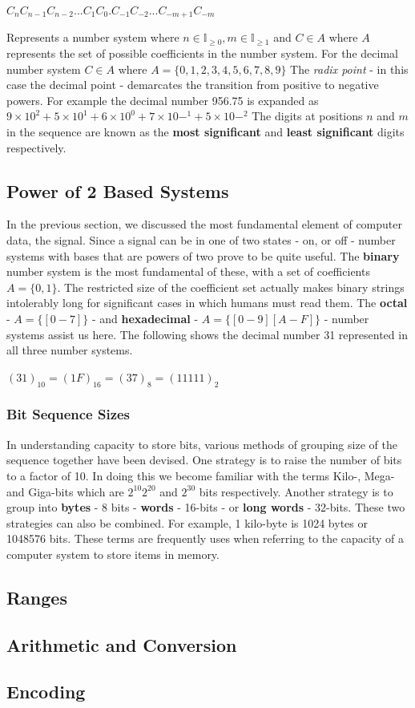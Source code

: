 \documentclass[10pt,a4paper]{article}
\begin{document}
\begin{center}
$C_{n} C_{n-1} C_{n-2}...C_{1} C_{0}.C_{-1} C_{-2}...C_{-m+1} C_{-m}$
\end{center}
Represents a number system where $n \in \mathbb{I}_{\geq0}, m \in \mathbb{I}_{\geq1}$ and $C \in A$ where $A$ represents the set of possible coefficients in the number system. For the decimal number system $C \in A$ where $A = \{0,1,2,3,4,5,6,7,8,9\}$
\newline\newline
The {\it radix point} - in this case the decimal point - demarcates the transition from positive to negative powers. For example the decimal number 956.75 is expanded as 
$9\times10^2 + 5\times10^1 + 6\times10^0 + 7\times10-^1 + 5\times10-^2$
\newline\newline
The digits at positions $n$ and $m$ in the sequence are known as the {\bf most significant} and {\bf least significant} digits respectively. 
\subsection{Power of 2 Based Systems}
In the previous section, we discussed the most fundamental element of computer data, the signal. Since a signal can be in one of two states - on, or off - number systems with bases that are powers of two prove to be quite useful. The {\bf binary} number system is the most fundamental of these, with a set of coefficients $A = \{0,1\}$. The restricted size of the coefficient set actually makes binary strings intolerably long for significant cases in which humans must read them. The {\bf octal} - $A= \{[0 - 7]\}$ - and {\bf hexadecimal} - $A = \{[0-9][A-F]\}$ - number systems assist us here. The following shows the decimal number 31 represented in all three number systems. 
\begin{center}
$(31)_{10} = (1F)_{16} = (37)_8 = (11111)_2$
\end{center} 
\subsubsection{Bit Sequence Sizes}
In understanding capacity to store bits, various methods of grouping size of the sequence together have been devised. One strategy is to raise the number of bits to a factor of 10. In doing this we become familiar with the terms Kilo-, Mega- and Giga-bits which are $2^{10} 2^{20}$ and $2^{30}$ bits respectively.  Another strategy is to group into {\bf bytes} - 8 bits - {\bf words} - 16-bits - or {\bf long words} - 32-bits. These two strategies can also be combined. For example, 1 kilo-byte is 1024 bytes or 1048576 bits. These terms are frequently uses when referring to the capacity of a computer system to store items in memory. 
\subsection{Ranges}
\subsection{Arithmetic and Conversion}
\subsection{Encoding}
{}

\end{document}

